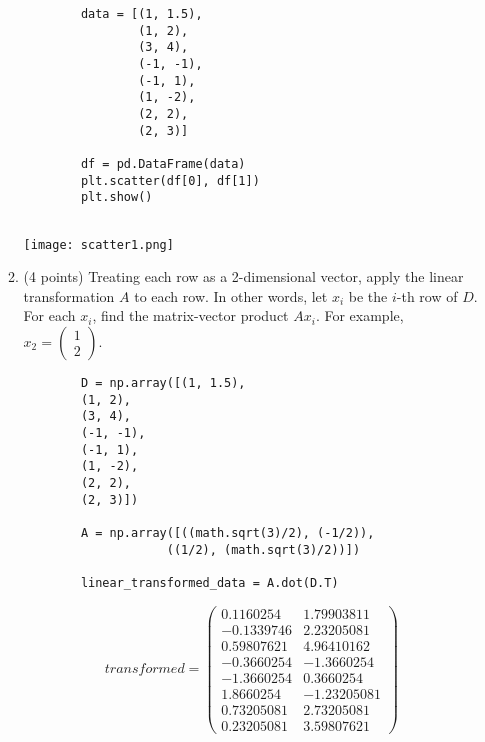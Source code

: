 \documentclass[11pt]{article}
\begin{document}
\begin{enumerate}
\begin{enumerate}
\begin{lstlisting}
        data = [(1, 1.5),
                (1, 2),
                (3, 4),
                (-1, -1),
                (-1, 1),
                (1, -2),
                (2, 2),
                (2, 3)]
        
        df = pd.DataFrame(data)
        plt.scatter(df[0], df[1])
        plt.show()
        
        \end{lstlisting}
        \newline \texttt{[image: scatter1.png]}

        \item (4 points) Treating each row as a 2-dimensional vector, apply the
        linear transformation $A$ to each row.  In other words, let $x_i$ be the
        $i$-th row of $D$. For each $x_i$, find the matrix-vector product $A
        x_i$.  For example, $x_2 = \begin{pmatrix} 1 \\  2 \end{pmatrix}$.
        \newline \begin{lstlisting}
        D = np.array([(1, 1.5),
        (1, 2),
        (3, 4),
        (-1, -1),
        (-1, 1),
        (1, -2),
        (2, 2),
        (2, 3)])
        
        A = np.array([((math.sqrt(3)/2), (-1/2)),
                    ((1/2), (math.sqrt(3)/2))])
                    
        linear_transformed_data = A.dot(D.T)
        \end{lstlisting}
        
        $$ transformed = \begin{pmatrix}
         0.1160254  & 1.79903811 \\
         -0.1339746  & 2.23205081 \\
          0.59807621 & 4.96410162 \\
         -0.3660254 & -1.3660254  \\
         -1.3660254 & 0.3660254  \\
          1.8660254 & -1.23205081 \\
          0.73205081 & 2.73205081 \\
          0.23205081 & 3.59807621
         \end{pmatrix}$$


\end{enumerate}
\end{enumerate}
\end{document}
